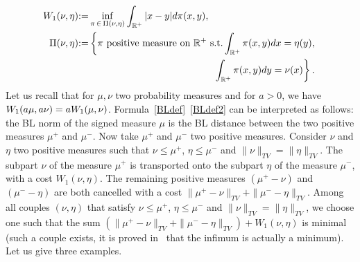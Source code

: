 \documentclass[AHL,Unicode,longabstracts,published]{cedram}
\newcommand*\R{\mathbb{R}}
\begin{document}
\begin{equation}\label{defWasserstein}
\begin{split}
W_1(\nu,\eta) &{:=}\inf\limits_{\pi\,\in\,\Pi(\nu,\eta)} \int_{\R^+} \vert x-y\vert d\pi(x,y),\\
\Pi(\nu,\eta) &{:=}\left\{
\pi\text{ positive measure on }\R^+\text{ s.t.} \int_{\R^+}\pi(x,y)dx=\eta(y),\right.\\
&\mkern250mu \left.\int_{\R^+}\pi(x,y)dy=\nu(x)\right\}.
\end{split}
\end{equation}
Let us recall that for $\mu,\nu$ two probability measures and for $a>0$, we have $W_1(a\mu, a\nu)\linebreak = a W_1(\mu,\nu)$. Formula~\eqref{BLdef}~\eqref{BLdef2} can be interpreted as follows: the BL norm of the signed measure $\mu$ is the BL distance between the two positive measures $\mu^+$ and $\mu^-$. Now take $\mu^+$ and $\mu^-$ two positive measures. Consider $\nu$ and $\eta$ two positive measures such that $\nu \leq \mu^+$, $\eta\leq \mu^-$ and $\|\nu\|_{TV}=\|\eta\|_{TV}$. The subpart $\nu$ of the measure $\mu^+$ is transported onto the subpart $\eta$ of the measure $\mu^-$, with a cost $W_1(\nu,\eta)$. The remaining positive measures $(\mu^+ -\nu)$ and $(\mu^- -\eta)$ are both cancelled with a cost $\|\mu^+ -\nu\|_{TV}+\|\mu^- -\eta\|_{TV} $. Among all couples $(\nu,\eta)$ that satisfy $\nu \leq \mu^+$, $\eta\leq \mu^-$ and $\|\nu\|_{TV}=\|\eta\|_{TV}$, we choose one such that the sum $(\|\mu^+ - \nu\|_{TV} +\|\mu^-- \eta\|_{TV})+ W_1(\nu,\eta)$ is minimal (such a couple exists, it is proved in~\cite{PR14} that the infimum is actually a minimum). Let us give three examples.
\end{document}
